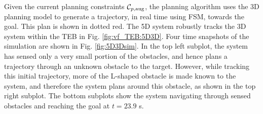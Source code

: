 Given the current planning constraints $\mathcal C_{p,\text{aug}}$, the planning algorithm uses the 3D planning model to generate a trajectory, in real time using FSM, towards the goal.
This plan is shown in dotted red.
The 5D system robustly tracks the 3D system within the TEB in Fig. \ref{fig:vf_TEB:5D3D}.
Four time snapshots of the simulation are shown in Fig. \ref{fig:5D3Dsim}.
In the top left subplot, the system has sensed only a very small portion of the obstacles, and hence plans a trajectory through an unknown obstacle to the target.
However, while tracking this initial trajectory, more of the L-shaped obstacle is made known to the system, and therefore the system plans around this obstacle, as shown in the top right subplot.
The bottom subplots show the system navigating through sensed obstacles and reaching the goal at $t=23.9$ s.

